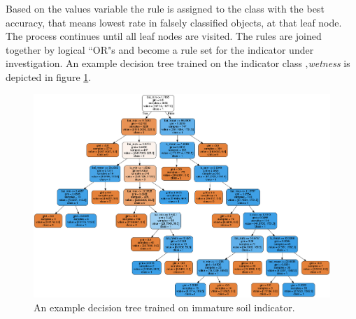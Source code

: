 \documentclass[authoryear,review,12pt,number]{elsarticle}
\begin{document}
Based on the values variable the rule is
assigned to the class with the best accuracy, that means lowest rate in falsely
classified objects, %
 at that leaf node.
The process continues until all leaf nodes are visited. The rules are joined together by
logical ``OR"s and become a rule set for the indicator under investigation. An
example decision tree trained on the indicator class ‚\textit{wetness} is
depicted in figure \ref{fig:decisiontree}.%
\begin{figure}
\includegraphics[width=\textwidth]{diagrams/natfo_immature_soil_dt.png}
    \caption{An example decision tree trained on immature soil 
indicator.\label{fig:decisiontree}}
\end{figure}

\end{document}
